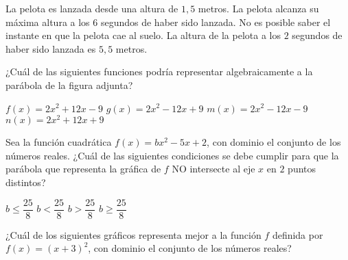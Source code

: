 \documentclass[borrador]{srs3}
\begin{document}
\begin{preguntas}
\begin{alternativas}
\alternativa La pelota es lanzada desde una altura de \(1,5\) metros.
\alternativa La pelota alcanza su máxima altura a los \(6\) segundos de haber sido lanzada.
\alternativa No es posible saber el instante en que la pelota cae al suelo.
\alternativa La altura de la pelota a los \(2\) segundos de haber sido lanzada es \(5,5\) metros.
\end{alternativas}
\pregunta ¿Cuál de las siguientes funciones podría representar algebraicamente a la parábola de la figura adjunta?
\begin{columnas}[0.6][c]
\begin{alternativas}
\alternativa \( f\left(x\right)=2x^2+12x-9 \)
\alternativa \( g\left(x\right)=2x^2-12x+9 \)
\alternativa \( m\left(x\right)=2x^2-12x-9 \)
\alternativa \( n\left(x\right)=2x^2+12x+9 \)
\end{alternativas}
\siguiente
{}
\end{columnas}
\pregunta Sea la función cuadrática \( f\left(x\right)=bx^2-5x+2 \), con dominio el conjunto de los números reales. ¿Cuál de las siguientes condiciones se debe cumplir para que la parábola que representa la gráfica de \(f\) NO intersecte al eje \(x\) en \(2\) puntos distintos?
\begin{alternativas}
\alternativa \( b \leq \dfrac{25}{8} \)
\alternativa \( b < \dfrac{25}{8} \)
\alternativa \( b > \dfrac{25}{8} \)
\alternativa \( b \geq \dfrac{25}{8} \)
\end{alternativas}
\pregunta ¿Cuál de los siguientes gráficos representa mejor a la función \(f\) definida por \( f\left(x\right)=\left(x+3\right)^2 \), con dominio el conjunto de los números reales?
\begin{alternativas}[2]
\alternativa \begin{tikzpicture}[scale=1]

\end{tikzpicture}
\end{alternativas}
\end{preguntas}
\end{document}

